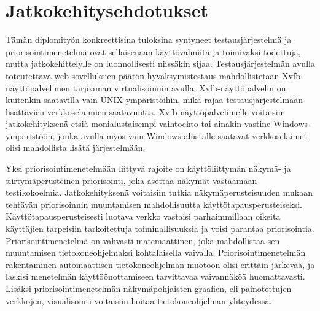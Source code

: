 \section{Jatkokehitysehdotukset} \label{ch:12_jatkokehitysehdotukset}

  Tämän diplomityön konkreettisina tuloksina syntyneet testausjärjestelmä ja priorisointimenetelmä ovat sellaisenaan käyttövalmiita ja toimivaksi todettuja, mutta jatkokehittelylle on luonnollisesti niissäkin sijaa.
  Testausjärjestelmän avulla toteutettava web-sovelluksien päätön hyväksymistestaus mahdollistetaan Xvfb-näyttöpalvelimen tarjoaman virtualisoinnin avulla.
  Xvfb-näyttöpalvelin on kuitenkin saatavilla vain UNIX-ympäristöihin, mikä rajaa testausjärjestelmään lisättävien verkkoselaimien saatavuutta.
  Xvfb-näyttöpalvelimelle voitaisiin jatkokehityksenä etsiä monialustaisempi vaihtoehto tai ainakin vastine Windows-ympäristöön, jonka avulla myös vain Windows-alustalle saatavat verkkoselaimet olisi mahdollista lisätä järjestelmään.

  Yksi priorisointimenetelmään liittyvä rajoite on käyttöliittymän näkymä- ja siirtymäperusteinen priorisointi, joka asettaa näkymät vastaamaan testikokoelmia.
  Jatkokehityksenä voitaisiin tutkia näkymäperusteisuuden mukaan tehtävän priorisoinnin muuntamisen mahdollisuutta käyttötapausperusteiseksi.
  Käyttötapausperusteisesti luotava verkko vastaisi parhaimmillaan oikeita käyttäjien tarpeisiin tarkoitettuja toiminallisuuksia ja voisi parantaa priorisointia.
  Priorisointimenetelmä on vahvasti matemaattinen, joka mahdollistaa sen muuntamisen tietokoneohjelmaksi kohtalaisella vaivalla.
  Priorisointimenetelmän rakentaminen automaattisen tietokoneohjelman muotoon olisi erittäin järkevää, ja laskisi menetelmän käyttöönottamiseen tarvittavaa vaivannäköä huomattavasti.
  Lisäksi priorisointimenetelmän näkymäpohjaisten graafien, eli painotettujen verkkojen, visualisointi voitaisiin hoitaa tietokoneohjelman yhteydessä.
